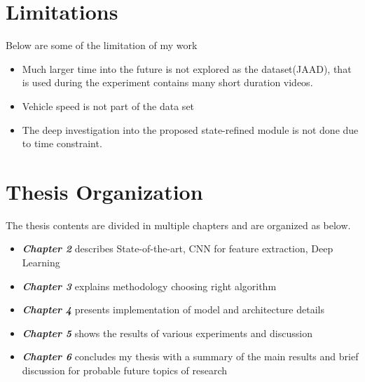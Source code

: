 \section{Limitations}
Below are some of the limitation of my work
\begin{itemize}
	\item Much larger time into the future is not explored as the dataset(JAAD), that is used during the experiment contains many short duration videos. 

	\item Vehicle speed is not part of the data set
	\item The deep investigation into the proposed state-refined module is not done due to time constraint.
\end{itemize}

\section{Thesis Organization }
The thesis contents are divided in multiple chapters and are organized as below.
\begin{itemize}
  \item {\textbf {\textit{Chapter 2}} describes State-of-the-art, CNN for feature extraction, Deep Learning}
  \item {\textbf {\textit{Chapter 3}} explains methodology choosing right algorithm}
	\item {\textbf {\textit{Chapter 4}} presents implementation of model and architecture details  }
	\item {\textbf {\textit{Chapter 5}} shows the results of various experiments and discussion  }
	\item {\textbf {\textit{Chapter 6}} concludes my thesis with a summary of the main results and brief discussion for probable future topics of research}
\end{itemize}

